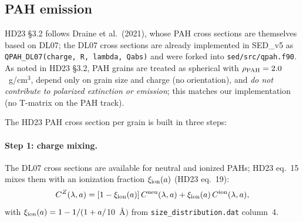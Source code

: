\documentclass{my_memo}
\begin{document}
\subsection{PAH emission}
\label{sec:pah}

HD23 \S3.2 follows Draine et al.\ (2021), whose PAH cross sections are
themselves based on DL07; the DL07 cross sections are already
implemented in SED\_v5 as \texttt{QPAH\_DL07(charge, R, lambda, Qabs)}
and were forked into \texttt{sed/src/qpah.f90}. As noted in HD23
\S3.2, PAH grains are treated as spherical with $\rho_{\rm PAH} =
2.0$~g/cm$^3$, depend only on grain size and charge (no orientation),
and \emph{do not contribute to polarized extinction or emission}; this
matches our implementation (no T-matrix on the PAH track).

The HD23 PAH cross section per grain is built in three steps:

\paragraph{Step 1: charge mixing.} The DL07 cross sections are
available for neutral and ionized PAHs; HD23 eq.~15 mixes them with an
ionization fraction $\xi_{\rm ion}(a)$ (HD23 eq.~19):
\begin{equation}
C^Z(\lambda, a) = [1 - \xi_{\rm ion}(a)]\,C^{\rm neu}(\lambda, a)
                + \xi_{\rm ion}(a)\,C^{\rm ion}(\lambda, a),
\end{equation}
with $\xi_{\rm ion}(a) = 1 - 1/(1 + a/$\SI{10}{\angstrom}$)$ from
\texttt{size\_distribution.dat} column~4.
\end{document}
